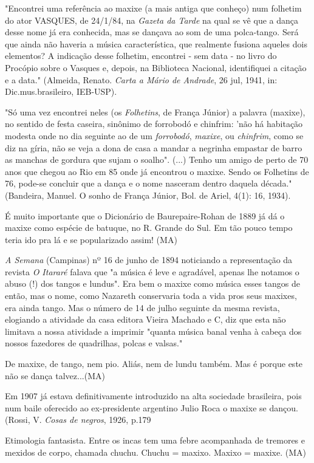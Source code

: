 "Encontrei uma referência ao maxixe (a mais antiga que conheço) num
folhetim do ator VASQUES, de 24/1/84, na \emph{Gazeta da Tarde} na qual
se vê que a dança desse nome já era conhecida, mas se dançava ao som de
uma polca-tango. Será que ainda não haveria a música característica, que
realmente fusiona aqueles dois elementos? A indicação desse folhetim,
encontrei - sem data - no livro do Procópio sobre o Vasques e, depois,
na Biblioteca Nacional, identifiquei a citação e a data." (Almeida,
Renato. \emph{Carta a Mário de Andrade}, 26 jul, 1941, in:
Dic.mus.brasileiro, IEB-USP).

"Só uma vez encontrei neles (os \emph{Folhetins}, de França Júnior) a
palavra (maxixe), no sentido de festa caseira, sinônimo de forrobodó e
chinfrim: 'não há habitação modesta onde no dia seguinte ao de um
\emph{forrobodó}, \emph{maxixe}, ou \emph{chinfrim}, como se diz na
gíria, não se veja a dona de casa a mandar a negrinha empastar de barro
as manchas de gordura que sujam o soalho". (...) Tenho um amigo de perto
de 70 anos que chegou ao Rio em 85 onde já encontrou o maxixe. Sendo os
Folhetins de 76, pode-se concluir que a dança e o nome nasceram dentro
daquela década." (Bandeira, Manuel. O sonho de França Júnior, Bol. de
Ariel, 4(1): 16, 1934).

É muito importante que o Dicionário de Baurepaire-Rohan de 1889 já dá o
maxixe como espécie de batuque, no R. Grande do Sul. Em tão pouco tempo
teria ido pra lá e se popularizado assim! (MA)

\emph{A Semana} (Campinas) nº 16 de junho de 1894 noticiando a
representação da revista \emph{O Itararé} falava que "a música é leve e
agradável, apenas lhe notamos o abuso (!) dos tangos e lundus". Era bem
o maxixe como música esses tangos de então, mas o nome, como Nazareth
conservaria toda a vida pros seus maxixes, era ainda tango. Mas o número
de 14 de julho seguinte da mesma revista, elogiando a atividade da casa
editora Vieira Machado e C, diz que esta não limitava a nossa atividade
a imprimir "quanta música banal venha à cabeça dos nossos fazedores de
quadrilhas, polcas e valsas."

De maxixe, de tango, nem pio. Aliás, nem de lundu também. Mas é porque
este não se dança talvez...(MA)

Em 1907 já estava definitivamente introduzido na alta sociedade
brasileira, pois num baile oferecido ao ex-presidente argentino Julio
Roca o maxixe se dançou. (Rossi, V. \emph{Cosas de negros}, 1926, p.179

Etimologia fantasista. Entre os incas tem uma febre acompanhada de
tremores e mexidos de corpo, chamada chuchu. Chuchu = maxixo. Maxixo =
maxixe. (MA)

